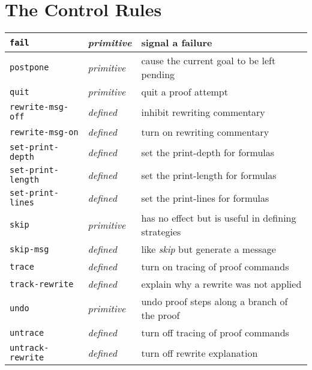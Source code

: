 \documentclass[12pt]{book}
\makeatletter
\newcommand{\indtt}[1]{\texttt{#1}\index{#1@{\texttt{#1}}}}  %
\makeatother
\begin{document}
\section{The Control Rules}
\begin{tabularx}{\textwidth}{|l|l|X|}\hline
\indtt{fail} & \emph{primitive} & signal a failure\\\hline
\indtt{postpone}& \emph{primitive} & cause the current goal to be
left pending\\\hline
\indtt{quit} & \emph{primitive} & quit a proof attempt \\\hline
\indtt{rewrite-msg-off} & \emph{defined} & inhibit rewriting
commentary\\\hline
\indtt{rewrite-msg-on} & \emph{defined} & turn on rewriting
commentary\\\hline
\indtt{set-print-depth} & \emph{defined} & set the print-depth for formulas \\\hline
\indtt{set-print-length} & \emph{defined} & set the print-length for formulas \\\hline
\indtt{set-print-lines} & \emph{defined} & set the print-lines for formulas \\\hline
\indtt{skip} & \emph{primitive} & has no effect but is useful in defining
strategies\\\hline
\indtt{skip-msg} & \emph{defined} & like \emph{skip} but generate a
message\\\hline
\indtt{trace} & \emph{defined} & turn on tracing of proof
commands\\\hline
\indtt{track-rewrite} & \emph{defined} & explain why a rewrite was not
applied\\\hline
\indtt{undo} & \emph{primitive} & undo proof steps along a branch of
the proof\\\hline
\indtt{untrace} & \emph{defined} & turn off tracing of proof commands\\\hline
\indtt{untrack-rewrite} & \emph{defined} & turn off rewrite explanation\\\hline
\end{tabularx}
\end{document}
